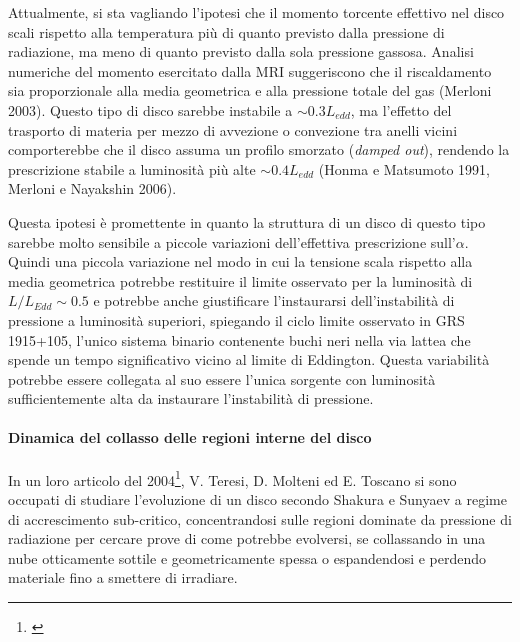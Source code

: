 \documentclass[a4paperbi]{article}
\begin{document}
		Attualmente, si sta vagliando l'ipotesi che il momento torcente effettivo nel disco scali rispetto alla temperatura più di quanto previsto dalla pressione di radiazione, ma meno di quanto previsto dalla sola pressione gassosa. Analisi numeriche del momento esercitato dalla MRI suggeriscono che il riscaldamento sia proporzionale alla media geometrica e alla pressione totale del gas (Merloni 2003). Questo tipo di disco sarebbe instabile a $\sim 0.3L_{edd}$, ma l'effetto del trasporto di materia per mezzo di avvezione o convezione tra anelli vicini comporterebbe che il disco assuma un profilo smorzato (\textit{damped out}), rendendo la prescrizione stabile a luminosità più alte $\sim 0.4L_{edd}$ (Honma e Matsumoto 1991, Merloni e Nayakshin 2006). 
	
	Questa ipotesi è promettente in quanto la struttura di un disco di questo tipo sarebbe molto sensibile a piccole variazioni dell'effettiva prescrizione sull'$\alpha$. Quindi una piccola variazione nel modo in cui la tensione scala rispetto alla media geometrica potrebbe restituire il limite osservato per la luminosità di $L/L_{Edd}\sim0.5$ e potrebbe anche giustificare l'instaurarsi dell'instabilità di pressione a luminosità superiori, spiegando il ciclo limite osservato in GRS 1915+105, l'unico sistema binario contenente buchi neri nella via lattea che spende un tempo significativo vicino al limite di Eddington. Questa variabilità potrebbe essere collegata al suo essere l'unica sorgente con luminosità sufficientemente alta da instaurare l'instabilità di pressione.
		 
	\paragraph{Dinamica del collasso delle regioni interne del disco}
	
	In un loro articolo del 2004\footnote{\cite{TeresiMolteniToscano2004}}, V. Teresi, D. Molteni ed E. Toscano si sono occupati di studiare l'evoluzione di un disco secondo Shakura e Sunyaev a regime di accrescimento sub-critico, concentrandosi sulle regioni dominate da pressione di radiazione per cercare prove di come potrebbe evolversi, se collassando in una nube otticamente sottile e geometricamente spessa o espandendosi e perdendo materiale fino a smettere di irradiare. 
	
\end{document}
